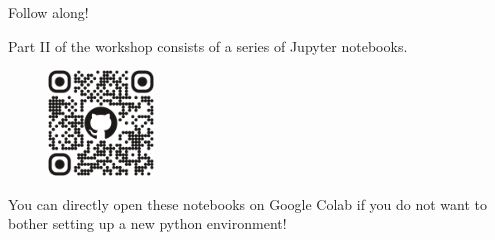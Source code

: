 \documentclass[12pt,aspectratio=169]{beamer}
\begin{document}
\begin{frame}{Follow along!}

Part II of the workshop consists of a series of Jupyter notebooks.
\newline

\begin{figure}
\centering
\includegraphics[width=0.25\textwidth]{figs/bayes_workshop_qr.png}
\end{figure}

You can directly open these notebooks on Google Colab if you do not want to bother setting up a new python environment!

\end{frame}











    
\end{document}
